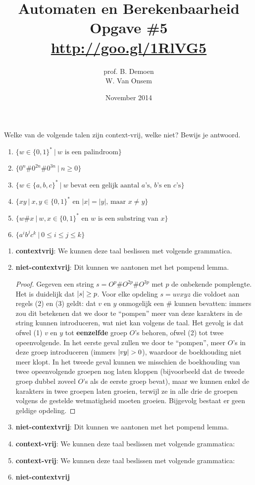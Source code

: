 \documentclass[a4paper]{article}
\title{Automaten en Berekenbaarheid\\Opgave \#5\\\url{http://goo.gl/1RlVG5}}
\author{prof. B. Demoen\\W. Van Onsem}
\date{November 2014}
\begin{document}
\maketitle

\begin{question}
Welke van de volgende talen zijn context-vrij, welke niet? Bewijs je antwoord.
  \begin{enumerate}
		    \item $\{ w \in \{0,1\}^* \ | \ \text{$w$ is een palindroom}\}$
      \item $\{ 0^n\#0^{2n}\#0^{3n} \ | \ n \geq 0 \}$
      \item $\{ w \in \{a,b,c\}^* \ | \ \text{$w$ bevat een gelijk aantal $a$'s, $b$'s en $c$'s} \}$
      \item $\{ xy \ | \ \text{$x,y \in \{0,1\}^*$ en $|x| = |y|$, maar $x \neq y$} \}$
      \item $\{ w \# x \ | \ \text{$w,x \in \{0,1\}^*$ en $w$ is een substring van $x$} \}$
		    \item $\{a^ib^jc^k \ | \ 0 \leq i \leq j \leq k \}$
  \end{enumerate}
\begin{answer}
\begin{enumerate}~~
\item \textbf{contextvrij}: We kunnen deze taal beslissen met volgende grammatica.
\item \textbf{niet-contextvrij}: Dit kunnen we aantonen met het pompend lemma.
\begin{proof}
Gegeven een string $s=O^p\#O^{2p}\#O^{3p}$ met $p$ de onbekende pomplengte. Het is duidelijk dat $\left|s\right|\geq p$. Voor elke opdeling $s=uvxyz$ die voldoet aan regels (2) en (3) geldt: dat $v$ en $y$ onmogelijk een $\#$ kunnen bevatten: immers zou dit betekenen dat we door te ``pompen'' meer van deze karakters in de string kunnen introduceren, wat niet kan volgens de taal. Het gevolg is dat ofwel (1) $v$ en $y$ tot \textbf{eenzelfde} groep $O$'s behoren, ofwel (2) tot twee opeenvolgende. In het eerste geval zullen we door te ``pompen'', meer $O$'s in deze groep introduceren (immers $\abs{vy}>0$), waardoor de boekhouding niet meer klopt. In het tweede geval kunnen we misschien de boekhouding van twee opeenvolgende groepen nog laten kloppen (bijvoorbeeld dat de tweede groep dubbel zoveel $O$'s als de eerste groep bevat), maar we kunnen enkel de karakters in twee groepen laten groeien, terwijl ze in alle drie de groepen volgens de gestelde wetmatigheid moeten groeien. Bijgevolg bestaat er geen geldige opdeling.
\end{proof}
\item \textbf{niet-contextvrij}: Dit kunnen we aantonen met het pompend lemma.
\item \textbf{context-vrij}: We kunnen deze taal beslissen met volgende grammatica:
\item \textbf{context-vrij}: We kunnen deze taal beslissen met volgende grammatica:
\item \textbf{niet-contextvrij}
\end{enumerate}
\end{answer}
\end{question}
\end{document}

